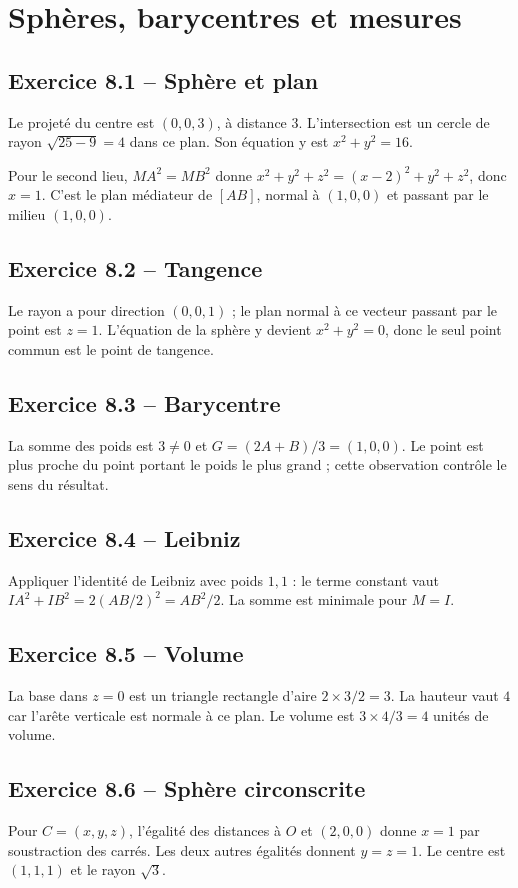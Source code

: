 \chapter{Sphères, barycentres et mesures}
\section*{Exercice 8.1 -- Sphère et plan}
Le projeté du centre est $(0,0,3)$, à distance $3$. L'intersection est un cercle de rayon $\sqrt{25-9}=4$ dans ce plan. Son équation y est $x^2+y^2=16$.

Pour le second lieu, $MA^2=MB^2$ donne $x^2+y^2+z^2=(x-2)^2+y^2+z^2$, donc $x=1$. C’est le plan médiateur de $[AB]$, normal à $(1,0,0)$ et passant par le milieu $(1,0,0)$.

\section*{Exercice 8.2 -- Tangence}
Le rayon a pour direction $(0,0,1)$ ; le plan normal à ce vecteur passant par le point est $z=1$. L'équation de la sphère y devient $x^2+y^2=0$, donc le seul point commun est le point de tangence.

\section*{Exercice 8.3 -- Barycentre}
La somme des poids est $3\ne0$ et $G=(2A+B)/3=(1,0,0)$. Le point est plus proche du point portant le poids le plus grand ; cette observation contrôle le sens du résultat.

\section*{Exercice 8.4 -- Leibniz}
Appliquer l'identité de Leibniz avec poids $1,1$ : le terme constant vaut $IA^2+IB^2=2(AB/2)^2=AB^2/2$. La somme est minimale pour $M=I$.

\section*{Exercice 8.5 -- Volume}
La base dans $z=0$ est un triangle rectangle d'aire $2\times3/2=3$. La hauteur vaut $4$ car l'arête verticale est normale à ce plan. Le volume est $3\times4/3=4$ unités de volume.

\section*{Exercice 8.6 -- Sphère circonscrite}
Pour $C=(x,y,z)$, l'égalité des distances à $O$ et $(2,0,0)$ donne $x=1$ par soustraction des carrés. Les deux autres égalités donnent $y=z=1$. Le centre est $(1,1,1)$ et le rayon $\sqrt3$.
